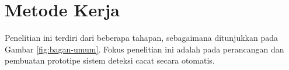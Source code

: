 \vspace{1em}

\section{Metode Kerja}
\noindent
Penelitian ini terdiri dari beberapa tahapan, sebagaimana ditunjukkan
pada Gambar \ref{fig:bagan-umum}. Fokus penelitian ini adalah pada
perancangan dan pembuatan prototipe sistem deteksi cacat secara otomatis.


